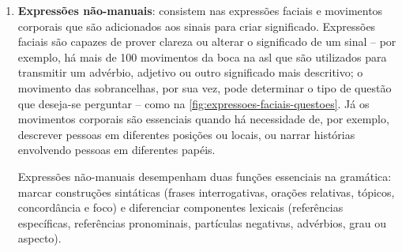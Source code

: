 \begin{enumerate}




    \item \textbf{Expressões não-manuais}: consistem nas expressões faciais e movimentos corporais que são adicionados aos sinais para criar significado. 
    Expressões faciais são capazes de prover clareza ou alterar o significado de um sinal -- por exemplo, há mais de 100 movimentos da boca na \acrshort{asl} que são utilizados para transmitir um advérbio, adjetivo ou outro significado mais descritivo; o movimento das sobrancelhas, por sua vez, pode determinar o tipo de questão que deseja-se perguntar -- como na \autoref{fig:expressoes-faciais-questoes}.
    Já os movimentos corporais são essenciais quando há necessidade de, por exemplo, descrever pessoas em diferentes posições ou locais, ou narrar histórias envolvendo pessoas em diferentes papéis.

    Expressões não-manuais desempenham duas funções essenciais na gramática: marcar construções sintáticas (frases interrogativas, orações relativas, tópicos, concordância e foco) e diferenciar componentes lexicais (referências específicas, referências pronominais, partículas negativas, advérbios, grau ou aspecto). 
    

\end{enumerate}
